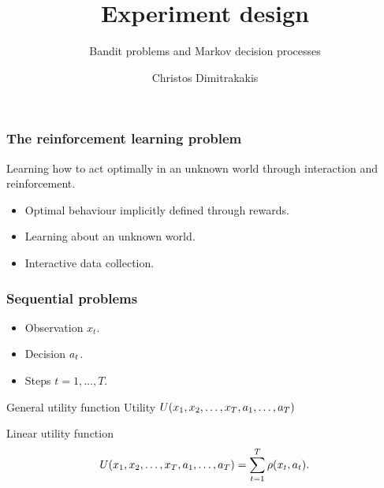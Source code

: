 \documentclass[9pt]{beamer}
\title{Experiment design}
\subtitle{Bandit problems and Markov decision processes}
\author{Christos Dimitrakakis}
\institute{UiO}
\begin{document}
\begin{frame}
  \titlepage
\end{frame}

\begin{frame}
  \tableofcontents
\end{frame}

\begin{frame}
  \frametitle{The reinforcement learning problem}
  \alert{Learning} how to \alert{act optimally} in an \alert{unknown world} through \alert{interaction} and \alert{reinforcement}.

  \begin{itemize}
  \item Optimal behaviour implicitly defined through rewards.
  \item Learning about an unknown world.
  \item Interactive data collection.
  \end{itemize}
\end{frame}


\begin{frame}
  \frametitle{Sequential problems}
  \begin{itemize}
  \item Observation $x_t$.
  \item Decision $a_t$.
  \item Steps $t = 1, \ldots, T$.
  \end{itemize}

  \begin{block}{General utility function}
    Utility $U(x_1, x_2, \ldots, x_T, a_1, \ldots, a_T)$
  \end{block}

  \begin{block}{Linear utility function}
    \[
      U(x_1, x_2, \ldots, x_T, a_1, \ldots, a_T)
      = 
      \sum_{t=1}^T \rho(x_t, a_t).
    \]
  \end{block}
\end{frame}
\end{document}
